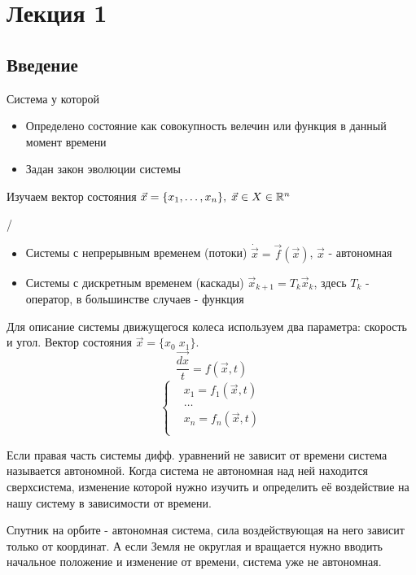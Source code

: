 \documentclass{article}
\begin{document}
\section{Лекция 1}

\subsection{Введение}
\begin{definition}
  Система у которой
  \begin{itemize}
    \item Определено состояние как совокупность велечин или функция в данный момент времени
    \item Задан закон эволюции системы
  \end{itemize} 
  Изучаем вектор состояния $\vec{x}=\{x_1,\dots,x_n\}, \; \vec{x}\in X\in \mathbb{R}^n$
\end{definition}
\begin{definition} /
  \begin{itemize}
    \item Системы с непрерывным временем (потоки) $\dot{\vec{x}}=\vec{f}(\vec{x})$, $\vec{x}$ - автономная
    \item Системы с дискретным временем (каскады) $\vec{x}_{k+1}=T_k \vec{x}_k$,
      здесь $T_k$ - оператор, в большинстве случаев - функция
  \end{itemize}
\end{definition}
\begin{eg}
  Для описание системы движущегося колеса используем два параметра: скорость и угол. 
  Вектор состояния $\vec{x}=\{x_0 \; x_1\}$.
  \[
    \frac{\vec{dx}}{t}=f(\vec{x},t)
  \]
  \[
    \left\{\begin{aligned}
        & x_1= f_1(\vec{x},t)  \\
        & \dots  \\
        & x_n= f_n(\vec{x},t)  \\
    \end{aligned}\right.
  \]
\end{eg}
\begin{definition}
  Если правая часть системы дифф. уравнений не зависит от времени система называется автономной. 
  Когда система не автономная над ней находится сверхсистема,
  изменение которой нужно изучить и определить её воздействие на нашу систему в зависимости от времени.
\end{definition}
\begin{eg}
  Спутник на орбите - автономная система, сила воздействующая на него зависит только от координат.
  А если Земля не округлая и вращается нужно вводить начальное положение и изменение от времени, система уже не автономная.
\end{eg}
\end{document}
